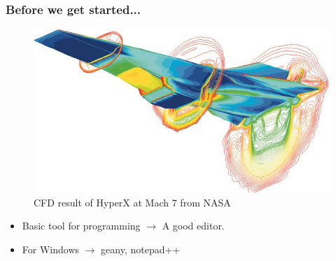 \begin{frame}
\frametitle{Before we get started...}
\begin{center}
\begin{figure}
\includegraphics[scale=0.25]{CFD-NASA-HyperX.png}
\caption{CFD result of HyperX at Mach 7 from NASA}
\end{figure}
\end{center}

\begin{itemize}
\item Basic tool for programming $\longrightarrow$ A good editor.
\item For Windows $\longrightarrow$ geany, notepad++ 
\end{itemize}

\end{frame}
